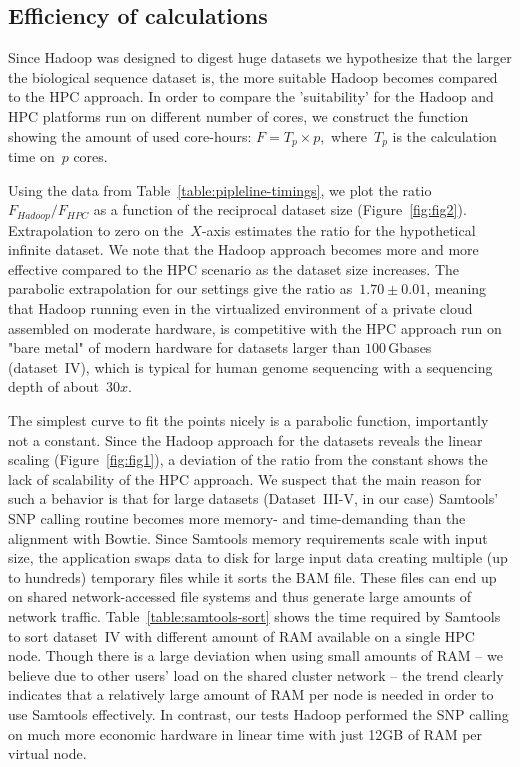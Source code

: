 \documentclass{bioinfo}
\begin{document}
\subsection*{Efficiency of calculations}

Since Hadoop was designed to digest huge datasets \citep{hadoop,lin2010} we hypothesize that the larger the biological sequence dataset is, the more suitable Hadoop becomes compared to the HPC approach. In order to compare the 'suitability' for the Hadoop and HPC platforms run on different number of cores, we construct the function showing the amount of used core-hours:
$F=T_{p}\times p,$ where~$T_{p}$ is the calculation time on~$p$ cores. 

Using the data from Table~\ref{table:pipleline-timings}, we plot the ratio $F_{Hadoop}/F_{HPC}$ as a function of the reciprocal dataset size (Figure~\ref{fig:fig2}). Extrapolation to zero on the~$X$-axis estimates the ratio for the hypothetical infinite dataset. We note that the Hadoop approach becomes more and more effective compared to the HPC scenario as the dataset size increases. 
The parabolic extrapolation for our settings give the ratio as~$1.70\pm0.01$, meaning that Hadoop running even in the virtualized environment of a private cloud assembled on moderate hardware, is competitive with the HPC approach run on "bare metal" of modern hardware for datasets larger than $100$\,Gbases (dataset~IV), which is typical for human genome sequencing with a sequencing depth of about~$30x$.


The simplest curve to fit the points nicely is a parabolic function, importantly not a constant. 
Since the Hadoop approach for the datasets reveals the linear scaling (Figure~\ref{fig:fig1}), a deviation of the ratio from the constant shows the 
lack of scalability of the HPC approach.
We suspect that the main reason for such a behavior is that for large datasets
(Dataset~III-V, in our case) Samtools' SNP calling routine becomes more memory-
and time-demanding than the alignment with Bowtie.  Since Samtools memory
requirements scale with input size, the application swaps
data to disk for large input data creating multiple (up to hundreds) temporary files while it sorts
the BAM file. These files can end up on shared network-accessed
file systems and thus generate large amounts of network traffic.
Table~\ref{table:samtools-sort} shows the time required by Samtools to sort dataset~IV with
different amount of RAM available on a single HPC node. Though there is a large
deviation when using small amounts of RAM -- we believe due to other users' load
on the shared cluster network -- the trend clearly indicates that a relatively
large amount of RAM per node is needed in order to use Samtools effectively. In
contrast, our tests Hadoop performed the SNP calling on much more economic
hardware in linear time with just 12GB of RAM per virtual node.
\end{document}
